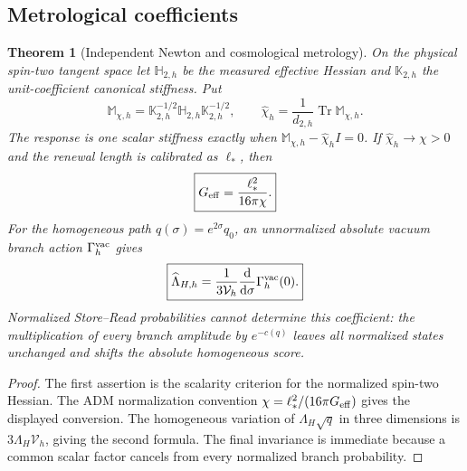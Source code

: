 \documentclass[11pt]{article}
\newtheorem{theorem}{Theorem}[section]
\theoremstyle{definition}
\theoremstyle{remark}
\newcommand{\Tr}{\operatorname{Tr}}
\newcommand{\dd}{\mathrm d}
\begin{document}
\subsection{Metrological coefficients}

\begin{theorem}[Independent Newton and cosmological metrology]
\label{thm:metrology-master}
On the physical spin-two tangent space let $\mathbb H_{2,h}$ be the measured
effective Hessian and $\mathbb K_{2,h}$ the unit-coefficient canonical
stiffness.  Put
\[
 \mathbb M_{\chi,h}
 =\mathbb K_{2,h}^{-1/2}\mathbb H_{2,h}\mathbb K_{2,h}^{-1/2},
 \qquad
 \widehat\chi_h=\frac1{d_{2,h}}\Tr\mathbb M_{\chi,h}.
\]
The response is one scalar stiffness exactly when
$\mathbb M_{\chi,h}-\widehat\chi_hI=0$.  If
$\widehat\chi_h\to\chi>0$ and the renewal length is calibrated as $\ell_*$,
then
\[
 \boxed{G_{\rm eff}=\frac{\ell_*^2}{16\pi\chi}.}
\]
For the homogeneous path $q(\sigma)=e^{2\sigma}q_0$, an unnormalized absolute
vacuum branch action $\Gamma_h^{\rm vac}$ gives
\[
 \boxed{
 \widehat\Lambda_{H,h}
 =\frac1{3\mathcal V_h}\frac{\dd}{\dd\sigma}
   \Gamma_h^{\rm vac}(0).}
\]
Normalized Store--Read probabilities cannot determine this coefficient: the
multiplication of every branch amplitude by $e^{-c(q)}$ leaves all normalized
states unchanged and shifts the absolute homogeneous score.
\end{theorem}

\begin{proof}
The first assertion is the scalarity criterion for the normalized spin-two
Hessian.  The ADM normalization convention
$\chi=\ell_*^2/(16\pi G_{\rm eff})$ gives the displayed conversion.  The
homogeneous variation of $\Lambda_H\sqrt q$ in three dimensions is
$3\Lambda_H\mathcal V_h$, giving the second formula.  The final invariance is
immediate because a common scalar factor cancels from every normalized branch
probability.
\end{proof}
\end{document}
